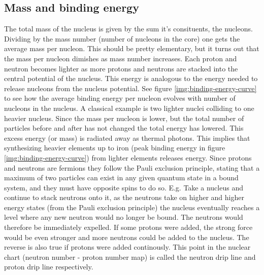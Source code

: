 \subsection{Mass and binding energy} \label{sec:binding-energy}
The total mass of the nucleus is given by the sum it's consituents, the nucleons.
Dividing by the mass number (number of nucleons in the core) one gets the average mass per nucleon.
This should be pretty elementary, but it turns out that the mass per nucleon dimishes
as mass number increases. Each proton and neutron becomes lighter as more protons and neutrons are stacked
into the central potential of the nucleus.
This energy is analogous to the energy needed to release nucleons from the nucleus potential.
See figure \ref{img:binding-energy-curve} to see how the average binding energy per nucleon evolves with number of nucleons in the nucleus.
\noindent
A classical example is two lighter nuclei colliding to one heavier nucleus. Since
the mass per nucleon is lower, but the total number of particles before and after has not changed the total
energy has lowered. This excess energy (or mass) is radiated away as thermal photons.
This implies that synthesizing heavier elements up to iron (peak binding energy in figure \ref{img:binding-energy-curve}) from
lighter elements releases energy.
Since protons and neutrons are fermions they follow the Pauli exclusion principle,
stating that a maximum of two particles can exist in any given quantum state in a bound system, and they must have opposite spins to do so.
\noindent
E.g. Take a nucleus and continue to stack neutrons onto it, as the neutrons take on
higher and higher energy states (from the Pauli exclusion principle) the nucleus eventually reaches
a level where any new neutron would no longer be bound. The neutrons would therefore be immediately expelled.
If some protons were added, the strong force would be even stronger and more neutrons could be
added to the nucleus. The reverse is also true if protons were added continously.
This point in the nuclear chart (neutron number - proton number map) is called the neutron drip line
and proton drip line respectively.

